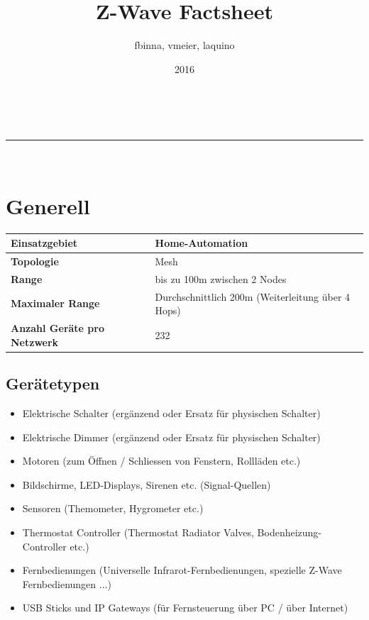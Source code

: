 \documentclass[a4paper,11pt]{article}
\makeatletter
\newcommand{\linia}{\rule{\linewidth}{0.5pt}}
\renewcommand{\maketitle}{
\begin{center}
\vspace{2ex}
{\huge \textsc{\@title}}
\vspace{1ex}
\\
\linia\\
\@author \hfill \@date
\vspace{4ex}
\end{center}
}
\makeatother
\begin{document}
\title{Z-Wave Factsheet}

\author{fbinna, vmeier, laquino}

\date{2016}

\maketitle

\section*{Generell}
{\renewcommand{\arraystretch}{1.5}
	\begin{tabular}{| p{3.5cm} | p{10cm} |}
		\hline
		\textbf{Einsatzgebiet} & Home-Automation \\\hline
		\textbf{Topologie} & Mesh \\\hline
		\textbf{Range} & bis zu 100m zwischen 2 Nodes \\\hline
		\textbf{Maximaler Range} & Durchschnittlich 200m (Weiterleitung über 4 Hops) \\\hline
		\textbf{Anzahl Geräte pro Netzwerk} & 232 \\\hline
		
	\end{tabular}
}
\subsection*{Gerätetypen}
\begin{itemize}
 \item Elektrische Schalter (ergänzend oder Ersatz für physischen Schalter)
 \item Elektrische Dimmer (ergänzend oder Ersatz für physischen Schalter)
 \item Motoren (zum Öffnen / Schliessen von Fenstern, Rollläden etc.)
 \item Bildschirme, LED-Displays, Sirenen etc. (Signal-Quellen)
 \item Sensoren (Themometer, Hygrometer etc.)
 \item Thermostat Controller (Thermostat Radiator Valves, Bodenheizung-Controller etc.)
 \item Fernbedienungen (Universelle Infrarot-Fernbedienungen, spezielle Z-Wave Fernbedienungen ...)
 \item USB Sticks und IP Gateways (für Fernsteuerung über PC / über Internet)
\end{itemize}
\end{document}
